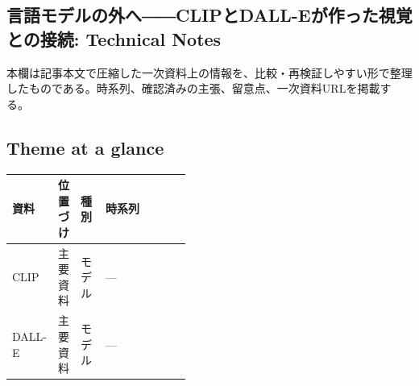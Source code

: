 \subsection*{言語モデルの外へ――CLIPとDALL-Eが作った視覚との接続: Technical Notes}
本欄は記事本文で圧縮した一次資料上の情報を、比較・再検証しやすい形で整理したものである。時系列、確認済みの主張、留意点、一次資料URLを掲載する。
\smallskip
{}\par
\medskip
\subsection*{Theme at a glance}
\begin{center}
\footnotesize
\begin{tabularx}{\linewidth}{@{}p{0.20\linewidth}p{0.10\linewidth}p{0.14\linewidth}X@{}}
\toprule
資料 & 位置づけ & 種別 & 時系列 \\
\midrule
CLIP & 主要資料 & モデル & — \\
DALL-E & 主要資料 & モデル & — \\
\bottomrule
\end{tabularx}
\end{center}
\normalsize

